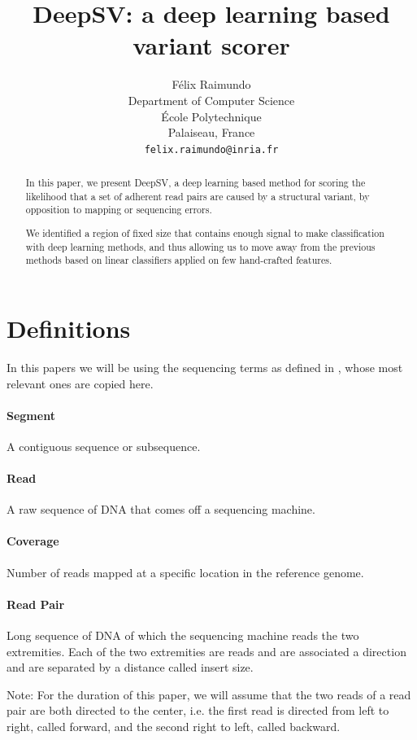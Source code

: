\documentclass{article}
\title{DeepSV: a deep learning based variant scorer}
\author{
  Félix Raimundo\\
  Department of Computer Science\\
  École Polytechnique\\
  Palaiseau, France\\
  \texttt{felix.raimundo@inria.fr}
}
\begin{document}
\maketitle

\begin{abstract}
  In this paper, we present DeepSV, a deep learning based method for scoring the likelihood that a set of adherent read pairs are caused by a structural variant, by opposition to mapping or sequencing errors.
  
  We identified a region of fixed size that contains enough signal to make classification
  with deep learning methods, and thus allowing us to move away from the previous methods
  based on linear classifiers applied on few hand-crafted features.
\end{abstract}

\section{Definitions}

In this papers we will be using the sequencing terms as defined in \cite{li_sequence_2009}, whose most
relevant ones are copied here.

\paragraph{Segment} A contiguous sequence or subsequence.
\paragraph{Read} A raw sequence of DNA that comes off a sequencing machine.
\paragraph{Coverage} Number of reads mapped at a specific location in the reference genome.
\paragraph{Read Pair} Long sequence of DNA of which the sequencing machine reads the two extremities. Each of the two extremities are reads and are associated a direction and are separated by a distance called insert size.

Note: For the duration of this paper, we will assume that the two reads of a read pair are both directed to the center, i.e. the first read is directed from left to right, called forward, and the second right to left, called backward.
\end{document}
